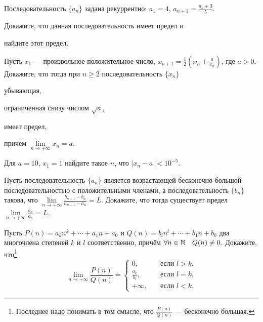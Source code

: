 \documentclass[a4paper, 12pt, num=31]{listok}
\begin{document}
\begin{problem}
    Последовательность $\{a_n\}$ задана рекуррентно: $a_1 = 4$, $a_{n + 1} = \frac{a_n + 3}5$.
    \begin{probparts}
        \item Докажите, что данная последовательность имеет предел и
        \item найдите этот предел.
    \end{probparts}
\end{problem}
\begin{problem}
    Пусть $x_1$ --- произвольное положительное число, $x_{n + 1} = \frac12 \left ( x_n + \frac a{x_n} \right )$, где $a > 0$.
    Докажите, что тогда при $n \ge 2$ последовательность $\{x_n\}$
    \begin{probparts}
        \item убывающая,
        \item ограниченная снизу числом $\sqrt a$,
        \item имеет предел,
        \item причём $\lim\limits_{n \to + \infty} x_n = a$.
        \item Для $a = 10$, $x_1 = 1$ найдите такое $n$, что $|x_n - a| < 10^{-5}$.
    \end{probparts}
\end{problem}
\begin{problem}
    Пусть последовательность $\{a_n\}$ является возрастающей бесконечно большой последовательностью с положительными членами,
    а последовательность $\{b_n\}$ такова, что $\lim\limits_{n\to+\infty}\frac{b_{n + 1} - b_n}{a_{n + 1} - a_n} = L$.
    Докажите, что тогда существует предел $\lim\limits_{n\to+\infty}\frac{b_n}{a_n} = L$.
\end{problem}
\begin{problem}
    Пусть $P(n) = a_k n^k + \cdots + a_1 n + a_0$ и $Q(n) = b_l n^l + \cdots + b_1 n + b_0$  два многочлена степеней $k$ и $l$ соответственно,
    причём $\forall{n \in \N} Q(n) \ne 0$.
    Докажите, что\footnote{Последнее надо понимать в том смысле, что $\frac{P (n)}{Q (n)}$ --- бесконечно большая.}
    \[
        \lim_{n \to + \infty} \frac{P(n)}{Q(n)} = \left \{ 
        \begin{aligned}
            0, & \quad\text{если $l > k$,} \\
            \frac{a_k}{b_l}, & \quad\text{если $l = k$,}\\
            +\infty, & \quad\text{если $l < k$.}
        \end{aligned}
        \right . 
    \]
\end{problem}
\end{document}
